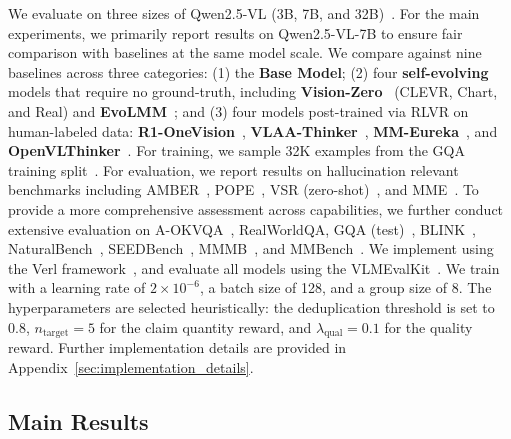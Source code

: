 We evaluate \ours on three sizes of Qwen2.5-VL (3B, 7B, and 32B)~\cite{qwen2p5vl}.
For the main experiments, we primarily report results on Qwen2.5-VL-7B to ensure fair comparison with baselines at the same model scale.
We compare against nine baselines across three categories:
(1) the \textbf{Base Model};
(2) four \textbf{self-evolving} models that require no ground-truth, including \textbf{Vision-Zero}~\cite{wang2026visionzero} (CLEVR, Chart, and Real) and \textbf{EvoLMM}~\cite{thawakar2025evolmm};
and (3) four models post-trained via RLVR on human-labeled data: \textbf{R1-OneVision}~\cite{yang2025r1}, \textbf{VLAA-Thinker}~\cite{chen2025vlaa}, \textbf{MM-Eureka}~\cite{meng2025mm}, and \textbf{OpenVLThinker}~\cite{deng2026openvlthinker}.
For training, we sample 32K examples from the GQA training split~\cite{hudson2019gqa}. 
For evaluation, we report results on hallucination relevant benchmarks including AMBER~\cite{wang2023amber}, POPE~\cite{li2023pope}, VSR (zero-shot)~\cite{liu2023vsr}, and MME~\cite{fu2026mme}. 
To provide a more comprehensive assessment across capabilities, we further conduct extensive evaluation on A-OKVQA~\cite{schwenk2022okvqa}, RealWorldQA, GQA (test)~\cite{hudson2019gqa}, BLINK~\cite{fu2024blink}, NaturalBench~\cite{li2024naturalbench}, SEEDBench~\cite{li2024seedbench}, MMMB~\cite{sun2025mmmb}, and MMBench~\cite{liu2024mmbench}.
% 
We implement \ours using the Verl framework~\cite{sheng2024hybridflow}, and evaluate all models using the VLMEvalKit~\cite{duan2024vlmevalkit}.
We train with a learning rate of $2\times10^{-6}$, a batch size of 128, and a group size of 8.
The hyperparameters are selected heuristically: the deduplication threshold is set to $0.8$, $n_{\text{target}}=5$ for the claim quantity reward, and $\lambda_{\text{qual}}=0.1$ for the quality reward.
Further implementation details are provided in Appendix~\ref{sec:implementation_details}.

\subsection{Main Results}

